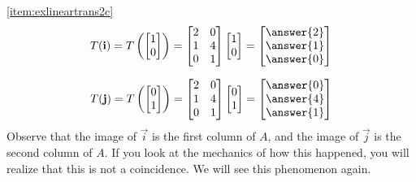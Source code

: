 \documentclass{ximera}
\begin{document}
\begin{example}
\begin{explanation}
\ref{item:exlineartrans2c}
$$T(\vec{i})=T\left(\begin{bmatrix}1\\0\end{bmatrix}\right)=\begin{bmatrix}
2&0\\
1&4\\
0&1
\end{bmatrix}\begin{bmatrix}1\\0\end{bmatrix}=\begin{bmatrix}\answer{2}\\\answer{1}\\\answer{0}\end{bmatrix}$$

$$T(\vec{j})=T\left(\begin{bmatrix}0\\1\end{bmatrix}\right)=\begin{bmatrix}
2&0\\
1&4\\
0&1
\end{bmatrix}\begin{bmatrix}0\\1\end{bmatrix}=\begin{bmatrix}\answer{0}\\\answer{4}\\\answer{1}\end{bmatrix}$$
Observe that the image of $\vec{i}$ is the first column of $A$, and the image of $\vec{j}$ is the second column of $A$.  If you look at the mechanics of how this happened, you will realize that this is not a coincidence.  We will see this phenomenon again.


\end{explanation}
\end{example}
\end{document}
